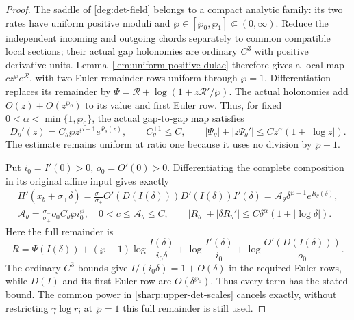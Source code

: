 \begin{proof}
The saddle of \eqref{deg:det-field} belongs to a compact analytic
family: its two rates have uniform positive moduli and
\(\wp\in[\wp_0,\wp_1]\Subset(0,\infty)\). Reduce the independent
incoming and outgoing chords separately to common compatible local
sections; their actual gap holonomies are ordinary \(C^3\) with
positive derivative units. Lemma~\ref{lem:uniform-positive-dulac}
therefore gives a local map \(cz^\wp e^{\mathcal R}\), with two
Euler remainder rows uniform through \(\wp=1\). Differentiation
replaces its remainder by
\(\Psi=\mathcal R+\log(1+z\mathcal R'/\wp)\).
The actual holonomies add \(O(z)+O(z^{\wp_0})\) to its value and
first Euler row. Thus, for fixed
\(0<\alpha<\min\{1,\wp_0\}\), the actual gap-to-gap map satisfies
\begin{equation}\label{sharp:upper-det-dulac}
 D_\theta'(z)=C_\theta\wp z^{\wp-1}e^{\Psi_\theta(z)},\qquad
 C_\theta^{\pm1}\le C,\qquad
 |\Psi_\theta|+|z\Psi_\theta'|\le Cz^\alpha(1+|\log z|).
\end{equation}
The estimate remains uniform at ratio one because it uses no division
by \(\wp-1\).

Put \(i_0=I'(0)>0\), \(o_0=O'(0)>0\). Differentiating the
complete composition in its original affine input gives exactly
\begin{equation}\label{sharp:upper-det-absolute}
 \begin{gathered}
 \Pi'(x_b+\sigma_+\delta)
 =\frac{\sigma_-}{\sigma_+}O'(D(I(\delta)))D'(I(\delta))I'(\delta)
 =\mathcal A_\theta\delta^{\wp-1}e^{R_\theta(\delta)},\\
 \mathcal A_\theta=\frac{\sigma_-}{\sigma_+}o_0C_\theta\wp i_0^\wp,
 \quad 0<c\le\mathcal A_\theta\le C,\qquad
 |R_\theta|+|\delta R_\theta'|\le C\delta^\alpha(1+|\log\delta|).
 \end{gathered}
\end{equation}
Here the full remainder is
\[
 R=\Psi(I(\delta))+(\wp-1)\log\frac{I(\delta)}{i_0\delta}
       +\log\frac{I'(\delta)}{i_0}
       +\log\frac{O'(D(I(\delta)))}{o_0}.
\]
The ordinary \(C^3\) bounds give \(I/(i_0\delta)=1+O(\delta)\)
in the required Euler rows, while \(D(I)\) and its first Euler row
are \(O(\delta^{\wp_0})\). Thus every term has the stated bound.
The common power in \eqref{sharp:upper-det-scales} cancels exactly,
without restricting \(\gamma\log r\); at \(\wp=1\) this full
remainder is still used.


\end{proof}
